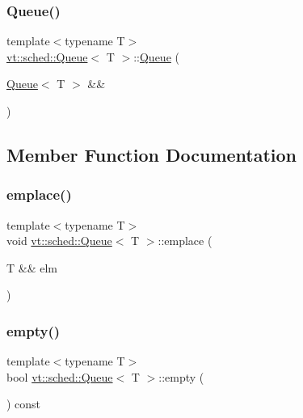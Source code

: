 \subsubsection{\texorpdfstring{Queue()}{Queue()}\hspace{0.1cm}{\footnotesize\ttfamily [3/3]}}
{\footnotesize\ttfamily template$<$typename T$>$ \\
\hyperlink{structvt_1_1sched_1_1_queue}{vt\+::sched\+::\+Queue}$<$ T $>$\+::\hyperlink{structvt_1_1sched_1_1_queue}{Queue} (\begin{DoxyParamCaption}\item[{\hyperlink{structvt_1_1sched_1_1_queue}{Queue}$<$ T $>$ \&\&}]{ }\end{DoxyParamCaption})\hspace{0.3cm}{\ttfamily [default]}}



\subsection{Member Function Documentation}
\mbox{\label{structvt_1_1sched_1_1_queue_a5b99b53786540fdff718540010fecb1b}} 
\subsubsection{\texorpdfstring{emplace()}{emplace()}}
{\footnotesize\ttfamily template$<$typename T$>$ \\
void \hyperlink{structvt_1_1sched_1_1_queue}{vt\+::sched\+::\+Queue}$<$ T $>$\+::emplace (\begin{DoxyParamCaption}\item[{T \&\&}]{elm }\end{DoxyParamCaption})\hspace{0.3cm}{\ttfamily [inline]}}

\mbox{\label{structvt_1_1sched_1_1_queue_a499b45b0a8c55731b09885dbd28882a8}} 
\subsubsection{\texorpdfstring{empty()}{empty()}}
{\footnotesize\ttfamily template$<$typename T$>$ \\
bool \hyperlink{structvt_1_1sched_1_1_queue}{vt\+::sched\+::\+Queue}$<$ T $>$\+::empty (\begin{DoxyParamCaption}{ }\end{DoxyParamCaption}) const\hspace{0.3cm}{\ttfamily [inline]}}


